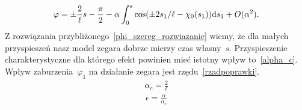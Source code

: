 \begin{align}\label{phi_szereg_rozwiazanie}
\varphi =  \pm \frac{2}{\ell}s - \frac{\pi}{2} 
-\alpha  \int_0^s \cos (\pm 2 s_1 / \ell  - \chi_0(s_1)  ) \text{d} s_1 
+O(\alpha^2).
\end{align}
Z rozwiązania przybliżonego~\eqref{phi_szereg_rozwiazanie} 
wiemy, że dla małych przyspieszeń nasz model zegara dobrze 
mierzy czas własny~$s$. Przyspieszenie charakterystyczne dla 
którego efekt powinien mieć istotny wpływ to~\eqref{alpha_c}.
Wpływ zaburzenia~$\varphi_1$ na działanie zegara jest 
rzędu~\eqref{rzadpoprawki}.
\begin{align}\label{alpha_c}
\alpha_c = \frac{2}{\ell}
\end{align}
\begin{align}\label{rzadpoprawki}
\epsilon = \frac{\alpha}{\alpha_c}
\end{align}

